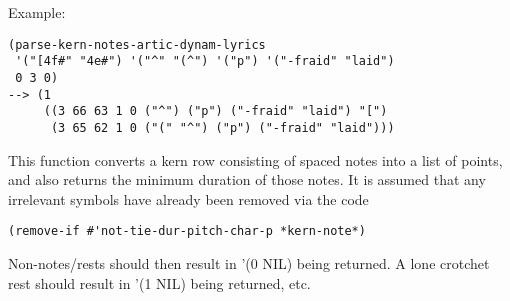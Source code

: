 \vspace{0.5cm}
\noindent Example:
\begin{verbatim}
(parse-kern-notes-artic-dynam-lyrics
 '("[4f#" "4e#") '("^" "(^") '("p") '("-fraid" "laid")
 0 3 0)
--> (1
     ((3 66 63 1 0 ("^") ("p") ("-fraid" "laid") "[")
      (3 65 62 1 0 ("(" "^") ("p") ("-fraid" "laid")))
\end{verbatim}

\noindent This function converts a kern row consisting
of spaced notes into a list of points, and also
returns the minimum duration of those notes. It is
assumed that any irrelevant symbols have already
been removed via the code
\begin{verbatim}
(remove-if #'not-tie-dur-pitch-char-p *kern-note*)
\end{verbatim}
Non-notes/rests should then result in '(0 NIL) being
returned. A lone crotchet rest should result in
'(1 NIL) being returned, etc.

